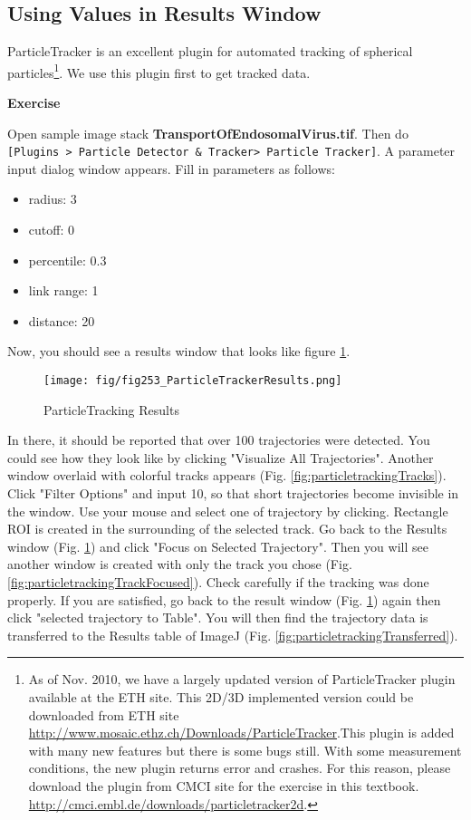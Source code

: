 \documentclass[11pt,a4paper,oneside]{report}
\newenvironment{indentexercise}[1]%
{{\setlength{\leftmargin}{2em}}%
\textbf{Exercise \thesubsection-#1}%
\begin{list}{}%
	\item%
}
{\end{list}}
\newcommand{\ijmenu}[1]{\texttt{\small#1}}
\begin{document}
\subsection{Using Values in Results Window}

ParticleTracker is an excellent plugin for automated tracking of spherical particles\footnote{ As of Nov. 2010, we have a largely updated version of ParticleTracker plugin available at the ETH site. This 2D/3D implemented version could be downloaded from ETH site \url{
http://www.mosaic.ethz.ch/Downloads/ParticleTracker}.This plugin is added with many new features but there is some bugs still. With some measurement conditions, the new plugin returns error and crashes. For this reason, please download the plugin from CMCI site for the exercise in this textbook. \url{http://cmci.embl.de/downloads/particletracker2d}.  }. We use this plugin first to get tracked data. 

\begin{indentexercise}{1}
\item Open sample image stack \textbf{TransportOfEndosomalVirus.tif}. Then do \ijmenu{[Plugins > Particle Detector \& Tracker> Particle Tracker]}. A parameter input dialog window appears. Fill in  parameters as follows:
\begin{itemize}
\item radius: 3
\item cutoff: 0
\item percentile: 0.3
\item link range: 1
\item distance: 20
\end{itemize}
\end{indentexercise}

Now, you should see a results window that looks like figure \ref{fig:particletrackingresults}.
\begin{figure}[htbp]
\begin{center}
\texttt{[image: fig/fig253\_ParticleTrackerResults.png]}
\caption{ParticleTracking Results}
\label{fig:particletrackingresults}
\end{center}
\end{figure}
In there, it should be reported that over 100 trajectories were detected. You could see how they look like by clicking "Visualize All Trajectories". 
Another window overlaid with colorful tracks appears 
(Fig. \ref{fig:particletrackingTracks}). 
Click "Filter Options" and input 10, so that short trajectories become invisible in the window. 
Use your mouse and select one of trajectory by clicking. 
Rectangle ROI is created in the surrounding of the selected track. 
Go back to the Results window (Fig. \ref{fig:particletrackingresults}) 
and click "Focus on Selected Trajectory". 
Then you will see another window is created with only the track you chose 
(Fig. \ref{fig:particletrackingTrackFocused}). 
Check carefully if the tracking was done properly. 
If you are satisfied, go back to the result window (Fig. \ref{fig:particletrackingresults}) 
again then click "selected trajectory to Table". 
You will then find the trajectory data is transferred to the Results table of ImageJ 
(Fig. \ref{fig:particletrackingTransferred}). 
 
\end{document}
